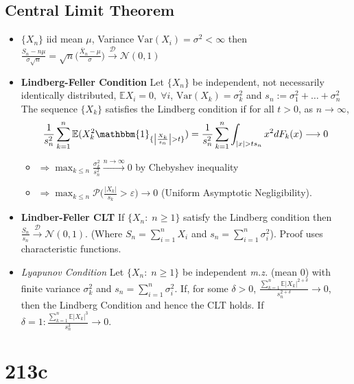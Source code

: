 \documentclass[11pt]{article}
\newcommand{\var}{\mrm{Var}}
\renewcommand{\P}{\mathbb{P}}
\newcommand{\ncal}{\mathcal{N}}
\newcommand{\eps}{\varepsilon}
\newcommand{\gd}{\delta}
\newcommand{\gs}{\sigma}
\newcommand{\mrm}{\mathrm}
\newcommand\abs[1]{\left|#1\right|}
\newcommand{\ind}[1]{\mathbbm{1}_{\{#1\}}}
\renewcommand{\to}{\longrightarrow}
\newcommand{\dto}{\overset{\mathcal{D}}{\to}}
\newcommand{\nto}{\overset{n \rightarrow \infty}{\to}}
\renewcommand{\P}{\mathcal{P}}
\newcommand{\E}{\mathbb{E}}
\newcommand{\imp}{\Rightarrow}
\newcommand{\gm}{\mu}
\newcommand{\seq}[1]{\{#1\}}
\begin{document}
\begin{multicols}{2}
\subsection{Central Limit Theorem}
\begin{itemize}
\item $\seq{X_n}$ iid mean $\gm$, Variance $\var(X_i)=\gs^2<\infty$ then $\frac{S_n-n\gm}{\gs \sqrt{n}}= \sqrt{n}\big(\frac{\bar{X}_n-\gm}{\gs}\big)\dto \ncal(0,1)$
\item \textbf{Lindberg-Feller Condition} Let $\seq{X_n}$ be independent, not necessarily identically distributed, $\E X_i = 0, \; \forall i$, $\var(X_k)=\gs_k^2$ and $s_n:= \gs_1^2+\ldots+\gs_n^2$  The sequence $\seq{X_k}$ satisfies the Lindberg condition if for all $t>0$, as $n \to \infty$, 
\begin{align*}
\frac{1}{s_n^2}\sum_{k=1}^n \E (X_k^2 \ind{\abs{\frac{X_k}{s_n}}> t}) = \frac{1}{s_n^2}\sum_{k=1}^n \int_{\abs{x}>ts_n} x^2 dF_k(x) \to 0
\end{align*}
\begin{itemize}
\item $\imp \max_{k \leq n} \frac{\gs^2_k}{s_n^2} \nto 0$ by Chebyshev inequality
\item $\imp \max_{k \leq n} \P \big(\frac{\abs{X_k}}{s_k}>\eps\big ) \to 0$ (Uniform Asymptotic Negligibility).
\end{itemize}
\item \textbf{Lindber-Feller CLT} If $\seq{X_n: \; n \geq 1}$ satisfy the Lindberg condition then  $\frac{S_n}{s_n} \dto \ncal(0,1)$. (Where $S_n=\sum_{i=1}^n X_i$ and $s_n = \sum_{i=1}^n \gs_i^2$). Proof uses characteristic functions.
\item \textit{Lyapunov Condition} Let $\seq{X_n: \; n \geq 1}$ be independent \textit{m.z.} (mean 0) with finite variance $\gs_k^2$ and $s_n = \sum_{i=1}^n \gs_i^2$.  If, for some $\gd>0$, $\frac{\sum_{k=1}^n\E \abs{X_k}^{2+\gd}}{s_n^{2+\gd}} \to 0$, then the Lindberg Condition and hence the CLT holds.  If $\gd = 1: \frac{\sum_{k=1}^n\E \abs{X_k}^{3}}{s_n^{3}} \to 0$.
\end{itemize}
\section{213c}
\end{multicols}
\end{document}
